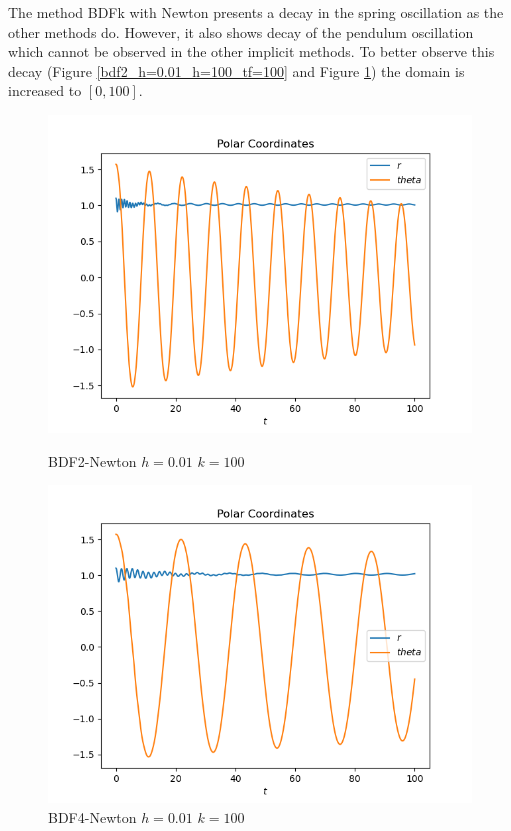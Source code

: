 \documentclass{scrartcl}
\begin{document}
The method BDFk with Newton presents a decay in the spring oscillation as the other methods do.
However, it also shows decay of the pendulum oscillation which cannot be observed in the other implicit methods.
To better observe this decay (Figure \ref{bdf2_h=0.01_h=100_tf=100} and Figure \ref{bdf4_h=0.01_h=100_tf=100.png}) the domain is increased to $[0, 100]$.

\begin{figure}[h]
\centering
\begin{minipage}[b]{0.45\textwidth}
\centering
\includegraphics[width=\textwidth]{../Plots/BDFk/bdf2_h=0.01_h=100_tf=100}
\caption{BDF2-Newton $h=0.01$ $k=100$}
\label{bdf2_h=0.01_h=100_tf=100}
\end{minipage}
\hfill
\begin{minipage}[b]{0.45\textwidth}
\centering
\includegraphics[width=\textwidth]{../Plots/BDFk/bdf4_h=0.01_h=100_tf=100}
\caption{BDF4-Newton $h=0.01$ $k=100$}
\label{bdf4_h=0.01_h=100_tf=100.png}
\end{minipage}
\end{figure}
\end{document}
